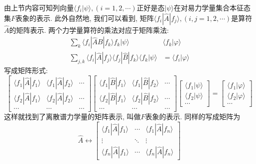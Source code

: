 \documentclass[a4paper,11pt]{book}
\newcommand{\A}{\hat{A}}
\newcommand{\B}{\hat{B}}
\begin{document}
由上节内容可知列向量$\langle f_i|\psi\rangle,(i=1,2,\cdots)$正好是态$|\psi\rangle$在对易力学量集合本征态集$F$表象的表示. 此外自然地, 我们可以看到, 矩阵$\langle f_i|\A|f_j\rangle,(i,j=1,2,\cdots)$是算符$\A$的矩阵表示. 两个力学量算符的乘法对应于矩阵乘法:
\begin{equation*}
  \begin{split}
     \sum_{k}\langle f_i|\A\B|f_k\rangle f_k|\psi\rangle & \langle f_k|\varphi\rangle \\
     \sum_{j,k}\langle f_i|\A|f_j\rangle\langle f_j|\B|f_k\rangle\langle f_k|\psi\rangle & =\langle f_i|\varphi\rangle
  \end{split}
\end{equation*}
写成矩阵形式:
\begin{equation*}
  \begin{bmatrix}
    \langle f_1|\A|f_1\rangle & \langle f_1|\A|f_2\rangle & \cdots \\
    \langle f_2|\A|f_1\rangle & \langle f_2|\A|f_2\rangle & \cdots \\
    \cdots & \cdots & \cdots
  \end{bmatrix}\begin{bmatrix}
                 \langle f_1|\B|f_1\rangle & \langle f_1|\B|f_2\rangle & \cdots \\
                 \langle f_2|\B|f_1\rangle & \langle f_2|\B|f_2\rangle & \cdots \\
                 \cdots & \cdots & \cdots
               \end{bmatrix}\begin{bmatrix}
                              \langle f_1|\psi\rangle \\
                              \langle f_2|\psi\rangle \\
                              \cdots
                            \end{bmatrix}=\begin{bmatrix}
                                            \langle f_1|\varphi\rangle \\
                                            \langle f_2|\varphi\rangle \\
                                            \cdots
                                          \end{bmatrix}
\end{equation*}
这样就找到了离散谱力学量的矩阵表示, 叫做$F$表象的表示. 同样的写成矩阵为
\begin{equation*}
  \A\longleftrightarrow\begin{bmatrix}
                         \langle f_1|\A|f_1\rangle & \cdots & \langle f_1|\A|f_n\rangle \\
                         \vdots & \ddots & \vdots \\
                         \langle f_n|\A|f_1\rangle & \cdots & \langle f_n|\A|f_n\rangle
                       \end{bmatrix}
\end{equation*}
\end{document}
